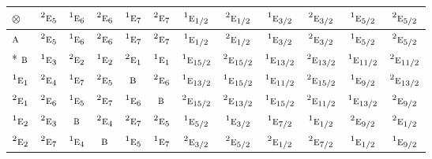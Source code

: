 \documentclass[10pt,a4paper]{article}
\numberwithin{equation}{section}
\newcommand{\irr}[1]{\text{\normalfont\scshape #1}}
\newcommand{\conjpair}[1]{{}^{#1}}
\newcommand{\irrprod}{\otimes}
\begin{document}
{\small\setlength{\tabcolsep}{3pt}\begin{longtable}{@{}lccccccccccc@{}}\toprule
$\irrprod$ & $\conjpair{2}\irr{e}_{5}$ & $\conjpair{1}\irr{e}_{6}$ & $\conjpair{2}\irr{e}_{6}$ & $\conjpair{1}\irr{e}_{7}$ & $\conjpair{2}\irr{e}_{7}$ & $\conjpair{1}\irr{e}_{1/2}$ & $\conjpair{2}\irr{e}_{1/2}$ & $\conjpair{1}\irr{e}_{3/2}$ & $\conjpair{2}\irr{e}_{3/2}$ & $\conjpair{1}\irr{e}_{5/2}$ & $\conjpair{2}\irr{e}_{5/2}$\\\midrule\endhead
\bottomrule\endfoot\endlastfoot
$\irr{a}$ & $\conjpair{2}\irr{e}_{5}$ & $\conjpair{1}\irr{e}_{6}$ & $\conjpair{2}\irr{e}_{6}$ & $\conjpair{1}\irr{e}_{7}$ & $\conjpair{2}\irr{e}_{7}$ & $\conjpair{1}\irr{e}_{1/2}$ & $\conjpair{2}\irr{e}_{1/2}$ & $\conjpair{1}\irr{e}_{3/2}$ & $\conjpair{2}\irr{e}_{3/2}$ & $\conjpair{1}\irr{e}_{5/2}$ & $\conjpair{2}\irr{e}_{5/2}$\\*
$\irr{b}$ & $\conjpair{1}\irr{e}_{3}$ & $\conjpair{2}\irr{e}_{2}$ & $\conjpair{1}\irr{e}_{2}$ & $\conjpair{2}\irr{e}_{1}$ & $\conjpair{1}\irr{e}_{1}$ & $\conjpair{1}\irr{e}_{15/2}$ & $\conjpair{2}\irr{e}_{15/2}$ & $\conjpair{1}\irr{e}_{13/2}$ & $\conjpair{2}\irr{e}_{13/2}$ & $\conjpair{1}\irr{e}_{11/2}$ & $\conjpair{2}\irr{e}_{11/2}$\\
$\conjpair{1}\irr{e}_{1}$ & $\conjpair{2}\irr{e}_{4}$ & $\conjpair{1}\irr{e}_{7}$ & $\conjpair{2}\irr{e}_{5}$ & $\irr{b}$ & $\conjpair{2}\irr{e}_{6}$ & $\conjpair{1}\irr{e}_{13/2}$ & $\conjpair{1}\irr{e}_{15/2}$ & $\conjpair{1}\irr{e}_{11/2}$ & $\conjpair{2}\irr{e}_{15/2}$ & $\conjpair{1}\irr{e}_{9/2}$ & $\conjpair{2}\irr{e}_{13/2}$\\
$\conjpair{2}\irr{e}_{1}$ & $\conjpair{2}\irr{e}_{6}$ & $\conjpair{1}\irr{e}_{5}$ & $\conjpair{2}\irr{e}_{7}$ & $\conjpair{1}\irr{e}_{6}$ & $\irr{b}$ & $\conjpair{2}\irr{e}_{15/2}$ & $\conjpair{2}\irr{e}_{13/2}$ & $\conjpair{1}\irr{e}_{15/2}$ & $\conjpair{2}\irr{e}_{11/2}$ & $\conjpair{1}\irr{e}_{13/2}$ & $\conjpair{2}\irr{e}_{9/2}$\\
$\conjpair{1}\irr{e}_{2}$ & $\conjpair{2}\irr{e}_{3}$ & $\irr{b}$ & $\conjpair{2}\irr{e}_{4}$ & $\conjpair{2}\irr{e}_{7}$ & $\conjpair{2}\irr{e}_{5}$ & $\conjpair{1}\irr{e}_{5/2}$ & $\conjpair{1}\irr{e}_{3/2}$ & $\conjpair{1}\irr{e}_{7/2}$ & $\conjpair{1}\irr{e}_{1/2}$ & $\conjpair{2}\irr{e}_{9/2}$ & $\conjpair{2}\irr{e}_{1/2}$\\
$\conjpair{2}\irr{e}_{2}$ & $\conjpair{2}\irr{e}_{7}$ & $\conjpair{1}\irr{e}_{4}$ & $\irr{b}$ & $\conjpair{1}\irr{e}_{5}$ & $\conjpair{1}\irr{e}_{7}$ & $\conjpair{2}\irr{e}_{3/2}$ & $\conjpair{2}\irr{e}_{5/2}$ & $\conjpair{2}\irr{e}_{1/2}$ & $\conjpair{2}\irr{e}_{7/2}$ & $\conjpair{1}\irr{e}_{1/2}$ & $\conjpair{1}\irr{e}_{9/2}$\\

\end{longtable}}
\end{document}
